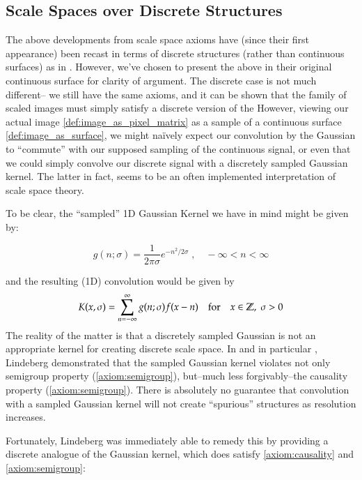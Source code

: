     
    
    \subsection{Scale Spaces over Discrete Structures} \label{subsec:discrete-scale-space}
    
    The above developments from scale space axioms have (since their first appearance)
    been recast in terms of discrete structures (rather than continuous surfaces) as in \cite{lindeberg-discrete}. However, we've chosen to present the above in their original continuous surface for clarity of argument. The discrete case is not much different--
    we still have the same axioms, and it can be shown that the family of scaled images
    must simply satisfy a discrete version of the 
    However, viewing our actual image
    \cref{def:image_as_pixel_matrix} as a sample of a continuous
    surface \cref{def:image_as_surface},
    we might na{\"i}vely expect our convolution by the Gaussian to ``commute'' with our supposed sampling of the continuous signal,
    or even that we could simply convolve our discrete signal with a discretely sampled Gaussian kernel. The latter in fact, seems to be an often implemented interpretation of scale space theory.
    
    To be clear, the ``sampled'' 1D Gaussian Kernel we have in mind might be given by:
   
    \begin{defn}
    	\[
    	g(n ; \sigma) = \frac{1}{2\pi \sigma} e^{-n^2 / 2\sigma} \;,\quad -\infty < n < \infty
    	\]
    	\end{defn}
    and the  resulting (1D) convolution would be given by
    \[
	    K(x,\sigma) = \sum_{n=-\infty}^{\infty} g(n;\sigma) f(x-n)
	    \quad \textrm{for} \quad x \in \mathbb{Z}, \; \sigma > 0
    \]
    The reality of the matter is that a discretely sampled Gaussian is not an appropriate kernel for creating discrete scale space. In \cite{lindeberg-discrete} and in particular
    \cite{lindeberg1988-discreteconstruction}, Lindeberg demonstrated that the sampled Gaussian kernel violates not only semigroup property (\cref{axiom:semigroup}), but--much less forgivably--the causality property (\cref{axiom:semigroup}). There is absolutely no guarantee that convolution with a sampled Gaussian kernel will not create ``spurious'' structures as resolution increases.
    
    
    Fortunately, Lindeberg was immediately able to remedy this by providing a discrete analogue of the Gaussian kernel, which does satisfy \cref{axiom:causality} and \cref{axiom:semigroup}:
    

